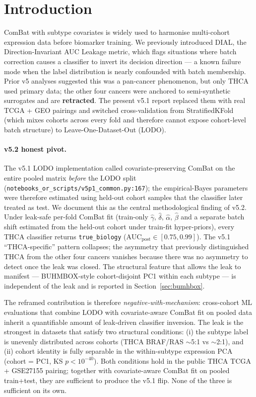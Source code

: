 \documentclass[11pt,a4paper]{article}
\begin{document}
\section{Introduction}
ComBat with subtype covariates is widely used to harmonise multi-cohort expression data before biomarker training. We previously introduced DIAL, the Direction-Invariant AUC Leakage metric, which flags situations where batch correction causes a classifier to invert its decision direction --- a known failure mode when the label distribution is nearly confounded with batch membership. Prior v5 analyses suggested this was a pan-cancer phenomenon, but only THCA used primary data; the other four cancers were anchored to semi-synthetic surrogates and are \textbf{retracted}. The present v5.1 report replaced them with real TCGA + GEO pairings and switched cross-validation from StratifiedKFold (which mixes cohorts across every fold and therefore cannot expose cohort-level batch structure) to Leave-One-Dataset-Out (LODO).

\paragraph{v5.2 honest pivot.} The v5.1 LODO implementation called covariate-preserving ComBat on the entire pooled matrix \emph{before} the LODO split (\texttt{notebooks\_or\_scripts/v5p1\_common.py:167}); the empirical-Bayes parameters were therefore estimated using held-out cohort samples that the classifier later treated as test. We document this as the central methodological finding of v5.2. Under leak-safe per-fold ComBat fit (train-only $\hat\gamma$, $\hat\delta$, $\hat\alpha$, $\hat\beta$ and a separate batch shift estimated from the held-out cohort under train-fit hyper-priors), every THCA classifier returns \texttt{true\_biology} ($\mathrm{AUC}_{\mathrm{post}} \in [0.75, 0.99]$). The v5.1 ``THCA-specific'' pattern collapses; the asymmetry that previously distinguished THCA from the other four cancers vanishes because there was no asymmetry to detect once the leak was closed. The structural feature that allows the leak to manifest --- BUHMBOX-style cohort-disjoint PC1 within each subtype --- is independent of the leak and is reported in Section~\ref{sec:bumhbox}.

The reframed contribution is therefore \emph{negative-with-mechanism}: cross-cohort ML evaluations that combine LODO with covariate-aware ComBat fit on pooled data inherit a quantifiable amount of leak-driven classifier inversion. The leak is the strongest in datasets that satisfy two structural conditions: (i) the subtype label is unevenly distributed across cohorts (THCA BRAF/RAS $\sim$5:1 vs $\sim$2:1), and (ii) cohort identity is fully separable in the within-subtype expression PCA (cohort = PC1, KS $p < 10^{-40}$). Both conditions hold in the public THCA TCGA + GSE27155 pairing; together with covariate-aware ComBat fit on pooled train+test, they are sufficient to produce the v5.1 flip. None of the three is sufficient on its own.
\end{document}
